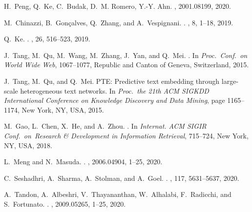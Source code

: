 \documentclass[J]{scitrans}
\begin{document}
\begin{thebibliography}{10}

H.~Peng, Q.~Ke, C.~Budak, D.~M. Romero, Y.-Y. Ahn.
, 2001.08199, 2020.

M.~Chinazzi, B.~Gon{\c{c}}alves, Q.~Zhang, and A.~Vespignani.
.
, 8, 1--18, 2019.

Q.~Ke.
.
,
  26, 516--523, 2019.

J.~Tang, M.~Qu, M.~Wang, M.~Zhang, J.~Yan, and Q.~Mei.
.
\newblock In {\em Proc.~Conf.~on World Wide Web}, 1067--1077, Republic and Canton of Geneva,
  Switzerland, 2015.

J.~Tang, M.~Qu, and Q.~Mei.
\newblock PTE: Predictive text embedding through large-scale heterogeneous text
  networks.
\newblock In {\em Proc.~the 21th ACM SIGKDD International Conference
  on Knowledge Discovery and Data Mining}, page 1165--1174,
  New York, NY, USA, 2015.

M.~Gao, L.~Chen, X.~He, and A.~Zhou.
.
\newblock In {\em Internat. ACM SIGIR Conf.~on~Research {\&}
  Development in Information Retrieval}, 715--724, New York, NY, USA, 2018.

L.~Meng and N.~Masuda.
.
, 2006.04904, 1--25, 2020.

C.~Seshadhri, A.~Sharma, A.~Stolman, and A.~Goel.
. 
, 117, 5631--5637, 2020.

A.~Tandon, A.~Albeshri, V.~Thayananthan, W.~Alhalabi, F.~Radicchi, and S.~Fortunato.
.
, 2009.05265, 1--25, 2020.

\end{thebibliography}
\end{document}
